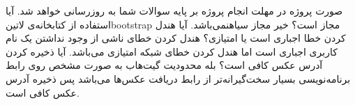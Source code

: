 \documentclass[../main.tex]{subfiles}
\begin{document}

صورت پروژه در مهلت انجام پروژه بر پایه سوالات شما به روزرسانی خواهد شد.
 آیا استفاده از کتابخانه‌ی ‌لاتین{bootstrap} مجاز است؟
 خیر مجاز ‌سیاه{نمی‌باشد}.
 آیا هندل کردن خطا اجباری است یا امتیازی؟
 هندل کردن خطای ناشی از وجود نداشتن یک نام کاربری اجباری است اما هندل کردن خطای شبکه امتیازی می‌باشد.
 آیا ذخیره کردن آدرس عکس کافی است؟
 بله محدودیت گیت‌هاب به صورت مشخص روی رابط برنامه‌نویسی بسیار سخت‌گیرانه‌تر از رابط دریافت عکس‌ها می‌باشد پس ذخیره آدرس عکس کافی است.
\end{document}
